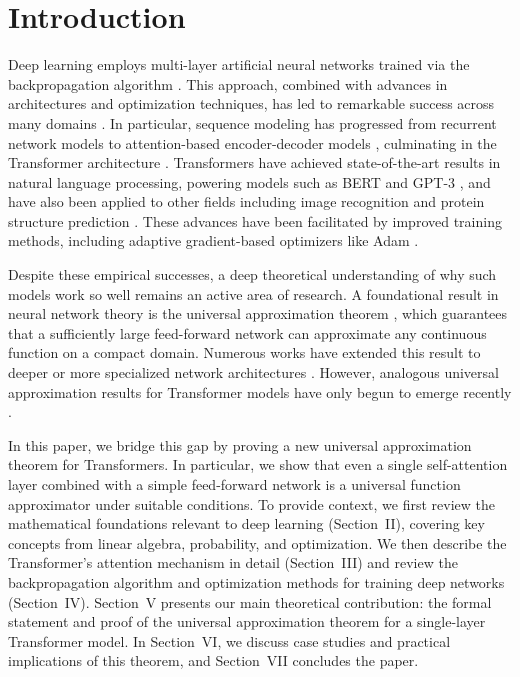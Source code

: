 \documentclass[conference]{IEEEtran}
\begin{document}
\section{Introduction}
Deep learning employs multi-layer artificial neural networks trained via the backpropagation algorithm \cite{rumelhart1986}. This approach, combined with advances in architectures and optimization techniques, has led to remarkable success across many domains \cite{lecun2015,goodfellow2016}. In particular, sequence modeling has progressed from recurrent network models \cite{sutskever2014} to attention-based encoder-decoder models \cite{bahdanau2015}, culminating in the Transformer architecture \cite{vaswani2017}. Transformers have achieved state-of-the-art results in natural language processing, powering models such as BERT \cite{devlin2019} and GPT-3 \cite{brown2020}, and have also been applied to other fields including image recognition \cite{dosovitskiy2021} and protein structure prediction \cite{jumper2021}. These advances have been facilitated by improved training methods, including adaptive gradient-based optimizers like Adam \cite{kingma2015}.

Despite these empirical successes, a deep theoretical understanding of why such models work so well remains an active area of research. A foundational result in neural network theory is the universal approximation theorem \cite{cybenko1989,hornik1989}, which guarantees that a sufficiently large feed-forward network can approximate any continuous function on a compact domain. Numerous works have extended this result to deeper or more specialized network architectures \cite{barron1993,lu2017,yarotsky2017}. However, analogous universal approximation results for Transformer models have only begun to emerge recently \cite{yun2020,kajitsuka2024}.

In this paper, we bridge this gap by proving a new universal approximation theorem for Transformers. In particular, we show that even a single self-attention layer combined with a simple feed-forward network is a universal function approximator under suitable conditions. To provide context, we first review the mathematical foundations relevant to deep learning (Section~II), covering key concepts from linear algebra, probability, and optimization. We then describe the Transformer's attention mechanism in detail (Section~III) and review the backpropagation algorithm and optimization methods for training deep networks (Section~IV). Section~V presents our main theoretical contribution: the formal statement and proof of the universal approximation theorem for a single-layer Transformer model. In Section~VI, we discuss case studies and practical implications of this theorem, and Section~VII concludes the paper.
\end{document}
